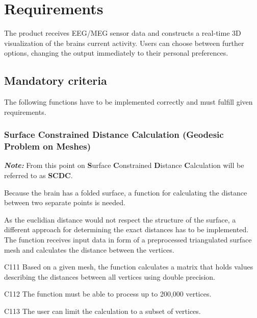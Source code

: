 \section{Requirements} 

	The product receives EEG/MEG sensor data and constructs a real-time 3D visualization of the brains current activity.
	Users can choose between further options, changing the output immediately to their personal preferences. 

\subsection{Mandatory criteria}

	The following functions have to be implemented correctly and must fulfill given requirements.
		
\subsubsection{Surface Constrained Distance Calculation (Geodesic Problem on Meshes)} \label{scdc}
	
	\begin{aims}
		
		\item[\textbf{\textit{Note:}}] From this point on \textbf{S}urface \textbf{C}onstrained \textbf{D}istance 
									   \textbf{C}alculation will be referred to as \textbf{SCDC}.
	
	\end{aims}
	
	Because the brain has a folded surface, a function for calculating the distance between two separate points is needed.
	
	As the euclidian distance would not respect the structure of the surface, a different approach for determining the exact 	distances has to be implemented.  
	The function receives input data in form of a preprocessed triangulated surface mesh and calculates the distance between 	the vertices.			

	\begin{aims}
	
		\item[C111] Based on a given mesh, the function calculates a matrix that holds values describing the distances between 						all vertices using double precision. 
		\item[C112] The function must be able to process up to 200,000 vertices.
		\item[C113] The user can limit the calculation to a subset of vertices. 
	
	\end{aims}

